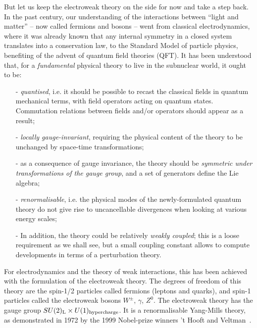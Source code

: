 But let us keep the electroweak theory on the side for now and take a step
back. In the past century, our understanding of the interactions
between ``light and matter'' -- now called fermions and bosons -- went
from classical electrodynamics, where it was already known that
any internal symmetry in a closed system translates into a
conservation law, to the Standard Model of particle
physics, benefiting of the advent of quantum field theories (QFT). It
has been understood that, for a \emph{fundamental} physical theory to live in the subnuclear
world, it ought to be:
\begin{itemize}
\item[-] \textit{quantised}, i.e. it should be possible to recast the
  classical fields in quantum mechanical terms, with field operators
  acting on quantum states. Commutation relations between fields
  and/or operators should appear as a result;
\item[-] \textit{locally gauge-invariant}, requiring the physical content
  of the theory to be unchanged by space-time transformations; 
\item[-] as a consequence of gauge invariance, the theory should be
  \textit{symmetric under transformations of the gauge group}, and a
  set of generators define the Lie algebra;
\item[-] \textit{renormalisable}, i.e. the physical modes of
  the newly-formulated quantum theory do not give rise to
  uncancellable divergences when looking at various energy scales;
\item[-] In addition, the theory could be relatively \textit{weakly coupled}; this is a loose
  requirement as we shall see, but a small
  coupling constant allows to compute developments in terms of a perturbation theory.
\end{itemize} 

For electrodynamics and the theory of weak interactions, this has been
achieved with the formulation of the electroweak theory. The degrees
of freedom of this theory are the spin-1/2 particles called fermions
(leptons and quarks), and spin-1 particles called the electroweak bosons
$W^{\pm}$, $\gamma$, $Z^0$. The electroweak theory has the gauge
group $SU(2)_{\rm L} \times U(1)_{\rm hypercharge}$. It is a
renormalisable Yang-Mills theory, as demonstrated in 1972 by the 1999 Nobel-prize winners 't Hooft and Veltman~\cite{tHooft:1972fi}.


